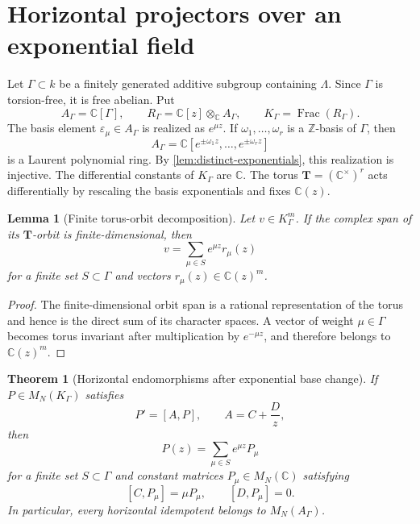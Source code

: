 \documentclass[11pt]{article}
\numberwithin{equation}{section}
\newtheorem{theorem}{Theorem}[section]
\newtheorem{lemma}[lemma]{Lemma}
\theoremstyle{definition}
\theoremstyle{remark}
\newcommand{\C}{\mathbb C}
\newcommand{\Frac}{\operatorname{Frac}}
\begin{document}
\section{Horizontal projectors over an exponential field}
\label{sec:projectors}

Let $\Gamma\subset k$ be a finitely generated additive subgroup containing
$\Lambda$.  Since $\Gamma$ is torsion-free, it is free abelian.  Put
\begin{equation}\label{eq:exponential-rings}
  A_\Gamma=\C[\Gamma],
  \qquad
  R_\Gamma=\C[z]\otimes_\C A_\Gamma,
  \qquad
  K_\Gamma=\Frac(R_\Gamma).
\end{equation}
The basis element $\varepsilon_\mu\in A_\Gamma$ is realized as
$e^{\mu z}$.  If $\omega_1,\ldots,\omega_r$ is a $\mathbb Z$-basis of
$\Gamma$, then
\[
  A_\Gamma=\C[e^{\pm\omega_1z},\ldots,e^{\pm\omega_rz}]
\]
is a Laurent polynomial ring.  By \cref{lem:distinct-exponentials}, this
realization is injective.  The differential constants of $K_\Gamma$ are
$\C$.  The torus $\mathbf T=(\C^\times)^r$ acts differentially by rescaling
the basis exponentials and fixes $\C(z)$.

\begin{lemma}[Finite torus-orbit decomposition]
\label{lem:finite-orbit}
Let $v\in K_\Gamma^m$.  If the complex span of its $\mathbf T$-orbit is
finite-dimensional, then
\[
  v=\sum_{\mu\in S}e^{\mu z}r_\mu(z)
\]
for a finite set $S\subset\Gamma$ and vectors
$r_\mu(z)\in\C(z)^m$.
\end{lemma}

\begin{proof}
The finite-dimensional orbit span is a rational representation of the torus
and hence is the direct sum of its character spaces.  A vector of weight
$\mu\in\Gamma$ becomes torus invariant after multiplication by
$e^{-\mu z}$, and therefore belongs to $\C(z)^m$.
\end{proof}

\begin{theorem}[Horizontal endomorphisms after exponential base change]
\label{thm:endomorphism-normal-form}
If $P\in M_N(K_\Gamma)$ satisfies
\begin{equation}\label{eq:horizontal-endomorphism}
  P'=[A,P],
  \qquad A=C+\frac Dz,
\end{equation}
then
\begin{equation}\label{eq:endomorphism-expansion}
  P(z)=\sum_{\mu\in S}e^{\mu z}P_\mu
\end{equation}
for a finite set $S\subset\Gamma$ and constant matrices
$P_\mu\in M_N(\C)$ satisfying
\begin{equation}\label{eq:intertwining}
  [C,P_\mu]=\mu P_\mu,
  \qquad
  [D,P_\mu]=0.
\end{equation}
In particular, every horizontal idempotent belongs to $M_N(A_\Gamma)$.
\end{theorem}
\end{document}

